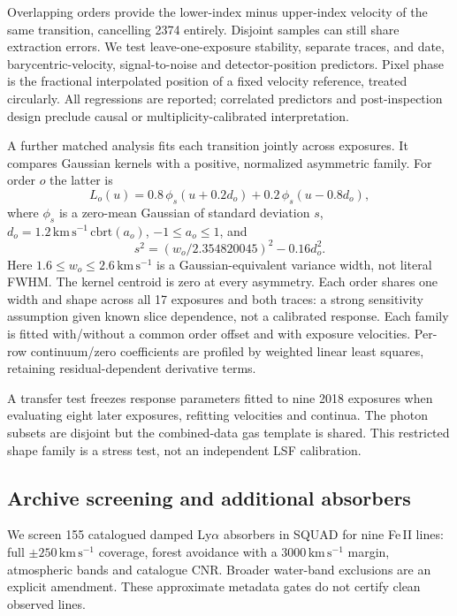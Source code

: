 Overlapping orders provide the lower-index minus upper-index velocity of the same transition, cancelling 2374 entirely. Disjoint samples can still share extraction errors. We test leave-one-exposure stability, separate traces, and date, barycentric-velocity, signal-to-noise and detector-position predictors. Pixel phase is the fractional interpolated position of a fixed velocity reference, treated circularly. All regressions are reported; correlated predictors and post-inspection design preclude causal or multiplicity-calibrated interpretation.

A further matched analysis fits each transition jointly across exposures. It compares Gaussian kernels with a positive, normalized asymmetric family. For order $o$ the latter is
\begin{equation}
 L_o(u)=0.8\,\phi_s(u+0.2d_o)+0.2\,\phi_s(u-0.8d_o),
 \label{eq:mixture_lsf}
\end{equation}
where $\phi_s$ is a zero-mean Gaussian of standard deviation $s$, $d_o=1.2\,\mathrm{km\,s^{-1}}\,\mathrm{cbrt}(a_o)$, $-1\leq a_o\leq1$, and
\begin{equation}
 s^2=(w_o/2.354820045)^2-0.16d_o^2.
\end{equation}
Here $1.6\leq w_o\leq2.6\,\mathrm{km\,s^{-1}}$ is a Gaussian-equivalent variance width, not literal FWHM. The kernel centroid is zero at every asymmetry. Each order shares one width and shape across all 17 exposures and both traces: a strong sensitivity assumption given known slice dependence, not a calibrated response. Each family is fitted with/without a common order offset and with exposure velocities. Per-row continuum/zero coefficients are profiled by weighted linear least squares, retaining residual-dependent derivative terms.

A transfer test freezes response parameters fitted to nine 2018 exposures when evaluating eight later exposures, refitting velocities and continua. The photon subsets are disjoint but the combined-data gas template is shared. This restricted shape family is a stress test, not an independent LSF calibration.

\subsection{Archive screening and additional absorbers}
\label{sec:archive_methods}
We screen 155 catalogued damped Ly$\alpha$ absorbers in SQUAD for nine Fe\,II lines: full $\pm250\,\mathrm{km\,s^{-1}}$ coverage, forest avoidance with a $3000\,\mathrm{km\,s^{-1}}$ margin, atmospheric bands and catalogue CNR. Broader water-band exclusions are an explicit amendment. These approximate metadata gates do not certify clean observed lines.

